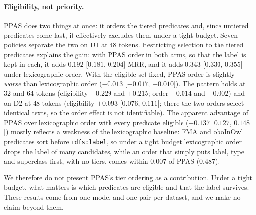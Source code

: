 \paragraph{Eligibility, not priority.}
PPAS does two things at once: it orders the tiered predicates and, since
untiered predicates come last, it effectively excludes them under a tight
budget. Seven policies separate the two on D1 at 48 tokens. Restricting
selection to the tiered predicates explains the gain: with PPAS order in
both arms, so that the label is kept in each, it adds $0.192$
[$0.181$, $0.204$] MRR, and it adds $0.343$ [$0.330$, $0.355$] under
lexicographic order. With the eligible set fixed, PPAS order is slightly
\emph{worse} than lexicographic order ($-0.013$ [$-0.017$, $-0.010$]). The
pattern holds at 32 and 64 tokens (eligibility $+0.229$ and $+0.215$;
order $-0.014$ and $-0.002$) and on D2 at 48 tokens (eligibility $+0.093$
[$0.076$, $0.111$]; there the two orders select identical texts, so the
order effect is not identifiable). The apparent advantage of PPAS over
lexicographic order with every predicate eligible ($+0.137$
[$0.127$, $0.148$]) mostly reflects a weakness of the lexicographic
baseline: FMA and oboInOwl predicates sort before \texttt{rdfs:label}, so
under a tight budget lexicographic order drops the label of many
candidates, while an order that simply puts label, type and superclass
first, with no tiers, comes within $0.007$ of PPAS ($0.487$).

We therefore do not present PPAS's tier ordering as a contribution. Under a
tight budget, what matters is which predicates are eligible and that the
label survives. These results come from one model and one pair per dataset,
and we make no claim beyond them.
